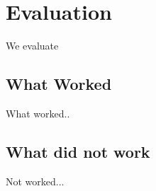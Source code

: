 \section{Evaluation}\label{sec:evaluation}
We evaluate 

\subsection{What Worked}
What worked..

\subsection{What did not work}
Not worked...

